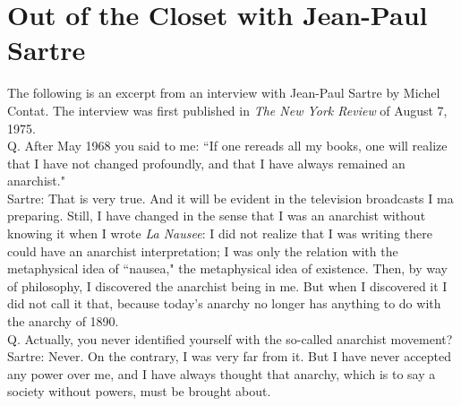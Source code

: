\chapter{Out of the Closet with Jean-Paul Sartre}

The following is an excerpt from an interview with Jean-Paul Sartre by Michel Contat. The interview was first published in \emph{The New York Review} of August 7, 1975.\\

\noindent Q. After May 1968 you said to me: ``If one rereads all my books, one will realize that I have not changed profoundly, and that I have always remained an anarchist."\\

\noindent Sartre: That is very true. And it will be evident in the television broadcasts I ma preparing. Still, I have changed in the sense that I was an anarchist without knowing it when I wrote \emph{La Nausee}: I did not realize that I was writing there could have an anarchist interpretation; I was only the relation with the metaphysical idea of ``nausea," the metaphysical idea of existence. Then, by way of philosophy, I discovered the anarchist being in me. But when I discovered it I did not call it that, because today's anarchy no longer has anything to do with the anarchy of 1890.\\

\noindent Q. Actually, you never identified yourself with the so-called anarchist movement?\\

\noindent Sartre: Never. On the contrary, I was very far from it. But I have never accepted any power over me, and I have always thought that anarchy, which is to say a society without powers, must be brought about.